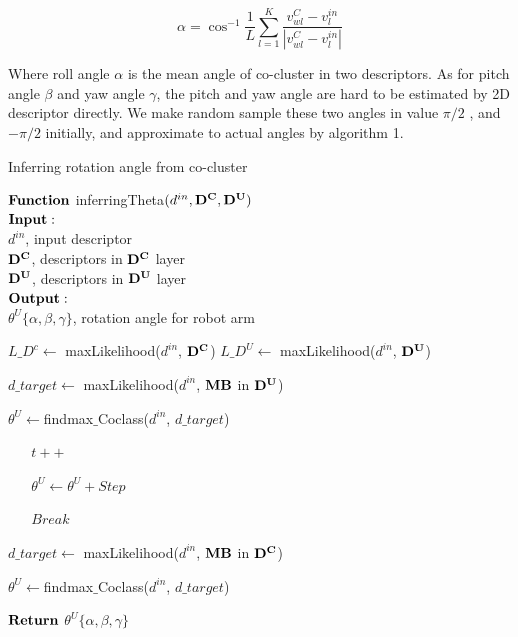\documentclass[journal]{IEEEtran}
\begin{document}
\begin{equation}
\alpha =\cos^{-1}\frac{1}{L}\sum_{l=1}^K\frac{v^C_{wl}-v^{in}_l}{|v^C_{wl}-v^{in}_l|}
\end{equation}

Where roll angle $\alpha$ is the mean angle of co-cluster in two descriptors. As for  pitch angle $\beta$ and yaw angle $\gamma$, the pitch and yaw angle are hard to be estimated by 2D descriptor directly. We make random sample these two angles in value $\pi/2$ , and $-\pi/2$ initially, and approximate to actual angles by algorithm 1.



\begin{algorithm}
  \caption{Inferring rotation angle from co-cluster}
   $\bf{Function}$ inferringTheta$(d^{in},\bf{D^C},\bf{D^U})$\\ 
  $\bf{Input:}$\\
   $d^{in}$, input descriptor\\
   $\bf{D^C}$, descriptors in $\bf{D^C}$ layer\\
   $\bf{D^U}$, descriptors in $\bf{D^U}$ layer\\
  $\bf{Output:}$\\
  $\theta^U\{\alpha,\beta,\gamma\}$, rotation angle for robot arm\\        
  \begin{algorithmic}[1]
    \State $L\_{D^c} \leftarrow$ maxLikelihood($d^{in}$, $\bf{D^C}$)
    \State $L\_{D^U} \leftarrow$ maxLikelihood($d^{in}$, $\bf{D^U}$)
    
 	$d\_target \leftarrow $ maxLikelihood($d^{in}$, $\bf{MB}$ in $\bf{D^U}$)
 		
 	$\theta^U\leftarrow$findmax$\_$Coclass($d^{in}$, $d\_target$)
 	
 		
 			
 				$\;\;\;\;\;\;t++$
 				
 				$\;\;\;\;\;\;\theta^U \leftarrow \theta^U+Step$
 				
 			\Else
 			
 				$\;\;\;\;\;\;Break$
 			\EndIf
 		
 		
 		
    	\EndWhile
    \Else
    
    	$d\_target \leftarrow $ maxLikelihood($d^{in}$, $\bf{MB}$ in $\bf{D^C}$)
    	
    	$\theta^U\leftarrow$findmax$\_$Coclass($d^{in}$, $d\_target$)
    \EndIf
    
	\State $\bf{Return}$ $\theta^U\{\alpha,\beta,\gamma\}$
    
  \end{algorithmic}
\end{algorithm}
\end{document}
